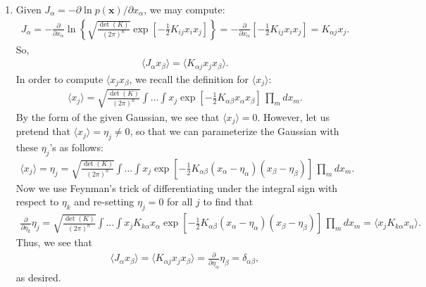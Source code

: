 \documentclass{article}
\theoremstyle{definition}
\newcommand{\p}{\partial}
\newcommand{\al}{\alpha}
\newcommand{\be}{\beta}
\newcommand{\f}[2]{\frac{#1}{#2}}
\newcommand{\lb}{\left[}
\newcommand{\rb}{\right]}
\newcommand{\lc}{\left\{}
\newcommand{\rc}{\right\}}
\begin{document}
\begin{enumerate}[label=(\alph*)]
	\item Given $J_\al = -\p \ln p(\mathbf{x})/\p x_\al$, we may compute:
	\begin{align*}
	J_\al = -\f{\p}{\p x_\al}\ln \lc \sqrt{\f{\det(K)}{(2\pi)^{n}}}  \exp\lb -\f{1}{2}K_{ij} x_i x_j \rb \rc = -\f{\p}{\p x_\al} \lb -\f{1}{2} K_{ij}x_ix_j \rb = K_{\al j} x_j.
	\end{align*}
	So, 
	\begin{align*}
	\langle J_\al x_\be \rangle = \langle K_{\al j} x_j x_\beta\rangle.
	\end{align*}
	In order to compute $\langle x_j x_\be$, we recall the definition for $\langle x_j \rangle$:
	\begin{align*}
	\langle x_j \rangle = \sqrt{\f{\det(K)}{(2\pi)^{n}}}\int \dots \int x_j \exp\lb -\f{1}{2}K_{\al\be}x_\al x_\be \rb  \, \prod_m dx_m.
	\end{align*}
	By the form of the given Gaussian, we see that $\langle x_j \rangle = 0$. However, let us pretend that $\langle x_j \rangle = \eta_j \neq 0$, so that we can parameterize the Gaussian with these $\eta_j$'s as follows:
	\begin{align*}
	\langle x_j \rangle = \eta_j = \sqrt{\f{\det(K)}{(2\pi)^{n}}}\int \dots \int x_j \exp\lb -\f{1}{2}K_{\al\be}(x_\al - \eta_\al)(x_\be  - \eta_\be)\rb  \, \prod_m dx_m.
	\end{align*}
	Now we use Feynman's trick of differentiating under the integral sign with respect to $\eta_k$ and re-setting $\eta_j=0$ for all $j$ to find that 
	\begin{align*}
	\f{\p}{\p \eta_k} \eta_j = \sqrt{\f{\det(K)}{(2\pi)^{n}}}\int \dots 
	\int x_j K_{k \al}x_\al 
	\exp\lb -\f{1}{2}K_{\al\be}(x_\al - \eta_\al)(x_\be  - \eta_\be)\rb  \, \prod_m dx_m = \langle x_j K_{k\al}x_\al\rangle.
	\end{align*}
	Thus, we see that 
	\begin{align*}
	\langle J_\al x_\be\rangle = \langle K_{\al j} x_j x_\be \rangle = \f{\p}{\p \eta_\al} \eta_{\be} = \delta_{\al\be}, 
	\end{align*}
	as desired.
	

\end{enumerate}
\end{document}

